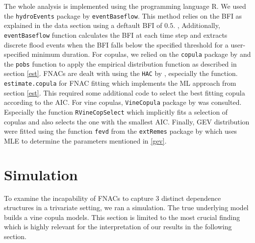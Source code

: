 \documentclass[
]{krantz}
\begin{document}
The whole analysis is implemented using the programming language R.
We used the \texttt{hydroEvents} package by \citet{wasko2025}
\texttt{eventBaseflow}. This method relies on the BFI as explained in the data section using a deftault BFI of \(0.5\). ,
Additionally, \texttt{eventBaseflow} function calculates the BFI at each time step and extracts discrete flood events when the BFI falls below the specified threshold for a user-specified minimum duration.
For copulas, we relied on the \texttt{copula} package by
\citet{hofert2025} and the \texttt{pobs} function to apply the empirical distribution function as described in section \ref{est}.
FNACs are dealt with using the
\texttt{HAC} by \citet{okhrin2014}, especially the
function.
\texttt{estimate.copula} for FNAC fitting which implements the ML approach from section \ref{est}. This required
some additional code to select the best fitting copula according to the AIC.
For vine copulas,
\texttt{VineCopula} package by \citet{nagler2024} was consulted.
Especially the function
\texttt{RVineCopSelect} which implicitly fits a selection of copulas and also selects the one with the smallest AIC.
Finally, GEV distribution were fitted using the function
\texttt{fevd} from the
\texttt{extRemes} package by \citet{gilleland2016} which uses MLE to determine the parameters mentioned in \ref{gev}.

\section{Simulation}\label{sim}

To examine the incapability of FNACs to capture \(3\) distinct dependence structures in a trivariate
setting, we ran a simulation.
The true underlying model builds a vine copula models.
This section is limited to the most crucial finding
which is highly relevant for the interpretation of our results in the following section.
\end{document}
